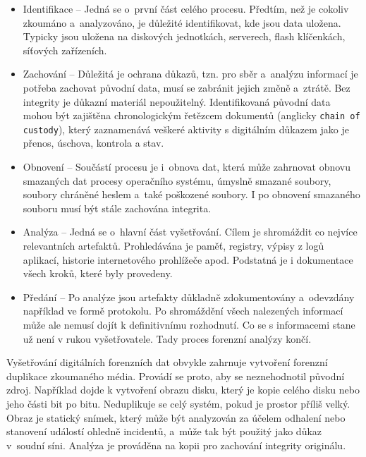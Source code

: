 \begin{itemize}
\item Identifikace -- Jedná se o~první část celého procesu. Předtím, než je cokoliv zkoumáno a~analyzováno, je důležité identifikovat, kde jsou data uložena. Typicky jsou uložena na diskových jednotkách, serverech, flash klíčenkách, síťových zařízeních.

\item Zachování -- Důležitá je ochrana důkazů, tzn. pro sběr a~analýzu informací je potřeba zachovat původní data, musí se zabránit jejich změně a~ztrátě. Bez integrity je důkazní materiál nepoužitelný. Identifikovaná původní data mohou být zajištěna chronologickým řetězcem dokumentů (anglicky \texttt{chain of custody}), který zaznamenává veškeré aktivity s digitálním důkazem jako je přenos, úschova, kontrola a stav.

\item Obnovení -- Součástí procesu je i~obnova dat, která může zahrnovat obnovu smazaných dat procesy operačního systému, úmyslně smazané soubory, soubory chráněné heslem a~také poškozené soubory. I po obnovení smazaného souboru musí být stále zachována integrita.

\item Analýza -- Jedná se o~hlavní část vyšetřování. Cílem je shromáždit co nejvíce relevantních artefaktů. Prohledávána je paměť, registry, výpisy z logů aplikací, historie internetového prohlížeče apod. Podstatná je i dokumentace všech kroků, které byly provedeny.

\item Předání -- Po analýze jsou artefakty důkladně zdokumentovány a~odevzdány například ve formě protokolu. Po shromáždění všech nalezených informací může ale nemusí dojít k definitivnímu rozhodnutí. Co se s informacemi stane už není v rukou vyšetřovatele. Tady proces forenzní analýzy končí.
\end{itemize}

\noindent Vyšetřování digitálních forenzních dat obvykle zahrnuje vytvoření forenzní duplikace zkoumaného média. Provádí se proto, aby se neznehodnotil původní zdroj. Například dojde k vytvoření obrazu disku, který je kopie celého disku nebo jeho části bit po bitu. Neduplikuje se celý systém, pokud je prostor příliš velký. Obraz je statický snímek, který může být analyzován za účelem odhalení nebo stanovení událostí ohledně incidentů, a~může tak být použitý jako důkaz v~soudní síni. Analýza je prováděna na kopii pro zachování integrity originálu.


